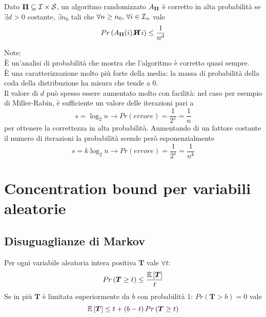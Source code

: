 \begin{definition}
    \label{def:correttezza_alta_prob}
    Dato $
    \bm{\Pi}{} \subseteq \mathcal{I}{} \times \mathcal{S}{}
    $, un algoritmo randomizzato $
    A_{\bm{\Pi}{}}
    $ è corretto in alta probabilità se $
    \exists d > 0
    $ costante, $
    \exists n_0
    $ tali che $
    \forall n \geq n_0, 
    \,
    \forall i \in \mathcal{I}{}_n
    $ vale 
    \begin{equation*}
        Pr \left( 
            A_{\bm{\Pi}{}}
            (i)
            \,
            \cancel{
                \bm{\Pi}{}
            }
            \,
            i
        \right)
        \leq
        \frac{1}{n^d}
    \end{equation*}
\end{definition}
Note:
\\
È un'analisi di probabilità che mostra che l'algoritmo è corretto quasi sempre.
\\
È una caratterizzazione molto più forte della media: la massa di probabilità della coda della distribuzione ha misura che tende a 0.
\\
Il valore di $d$ può spesso essere aumentato molto con facilità: nel caso per esempio di Miller-Rabin, è sufficiente un valore delle iterazioni pari a 
\begin{equation*}
    s = \log_2 n
    \rightarrow
    Pr \left( errore \right)
    =
    \frac{1}{2^s}
    =
    \frac{1}{n}
\end{equation*}
per ottenere la correttezza in alta probabilità.
Aumentando di un fattore costante il numero di iterazioni la probabilità scende però esponenzialmente 
\begin{equation*}
    s = k \log_2 n
    \rightarrow
    Pr \left( errore \right)
    =
    \frac{1}{2^s}
    =
    \frac{1}{n^{k}}
\end{equation*}

\section{Concentration bound per variabili aleatorie}

\subsection{Disuguaglianze di Markov}
Per ogni variabile aleatoria intera positiva $
\bm{T}
$ vale $
\forall t
$:
\begin{equation*}
    Pr \left( 
        \bm{T} \geq t
    \right)
    \leq
    \frac{
        \mathbb{E}\left[
            \bm{T}
        \right]
    }{
        t
    }
\end{equation*}
Se in più $
\bm{T}
$ è limitata superiormente da $b$ con probabilità 1: $
Pr \left( \bm{T} > b \right) = 0
$ vale
\begin{equation*}
    \mathbb{E}\left[\bm{T}\right]
    \leq 
    t + 
    \left( 
        b - t
    \right)
    Pr \left( 
        \bm{T} \geq t
    \right)
\end{equation*}

